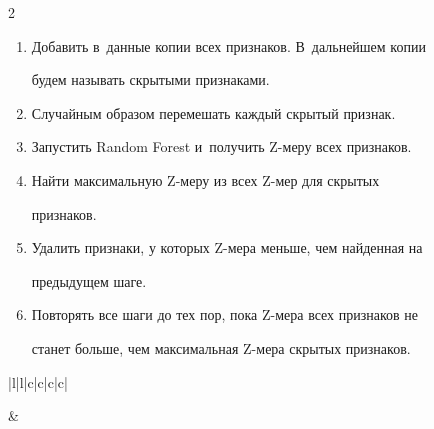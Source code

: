 \begin{multicols}{2}
  \begin{enumerate}[1.]

  \item Добавить в~данные копии всех признаков. В~дальнейшем копии 

будем называть скрытыми признаками.

  \item Случайным образом перемешать каждый скрытый признак. 

   \item Запустить Random Forest и~получить Z-ме\-ру всех признаков.

  \item Найти максимальную Z-ме\-ру из всех Z-мер для скрытых 

признаков.

  \item Удалить признаки, у которых Z-ме\-ра меньше, чем найденная на 

предыдущем шаге. 

  \item Повторять все шаги до тех пор, пока Z-ме\-ра всех признаков не 

станет больше, чем максимальная Z-ме\-ра скрытых признаков.

  \end{enumerate}

  

   \begin{table}\small %

  \begin{center}


  \vspace*{2ex}

  

  \begin{tabular}{|l|l|c|c|c|c|}

  \hline

&

\end{tabular}
\end{center}
\end{table}
\end{multicols}
